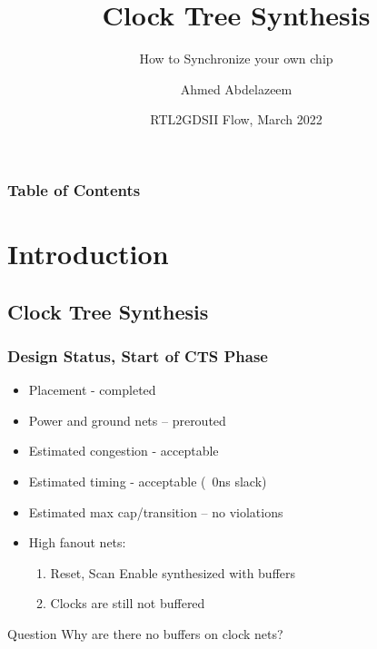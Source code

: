 \documentclass[compress]{beamer}
\title[ASIC Physical Design] %
{Clock Tree Synthesis}
\subtitle{How to Synchronize your own chip}
\author[Ahmed Abdelazeem] %
{Ahmed Abdelazeem}
\institute[ZU] %
{
	Faculty of Engineering\\
	Zagazig University
}
\date[ZU 2023] %
{RTL2GDSII Flow, March 2022}
\begin{document}
	
	\frame{\titlepage}
	
	
	\begin{frame}
		\frametitle{Table of Contents}
		\tableofcontents
	\end{frame}
\section[Intro]{Introduction}
\subsection[CTS]{Clock Tree Synthesis}
\begin{frame}
	\frametitle{Design Status, Start of CTS Phase}
	\begin{itemize}
		\item Placement - completed
		\item Power and ground nets – prerouted
		\item Estimated congestion - acceptable
		\item Estimated timing - acceptable (~0ns slack)
		\item Estimated max cap/transition – no violations
		\item High fanout nets:
			\begin{enumerate}
				\item Reset, Scan Enable synthesized with buffers
				\item Clocks are still not buffered
			\end{enumerate}
	\end{itemize}
\pause
\begin{alertblock}{Question}
Why are there no buffers on clock nets?
\end{alertblock}
\end{frame}	
\end{document}
